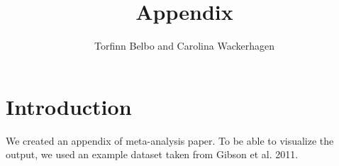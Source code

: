 \documentclass[11pt, a4paper]{article} %
\begin{document}

\newcommand{\multilineC}[1]{\begin{tabular}[b]{@{}c@{}}#1\end{tabular}}


\title{Appendix}

\author{Torfinn Belbo and Carolina Wackerhagen}

\maketitle



\section{Introduction}%

We created an appendix of meta-analysis paper. To be able to visualize the output, we used an example dataset taken from Gibson et al. 2011.


\end{document}
